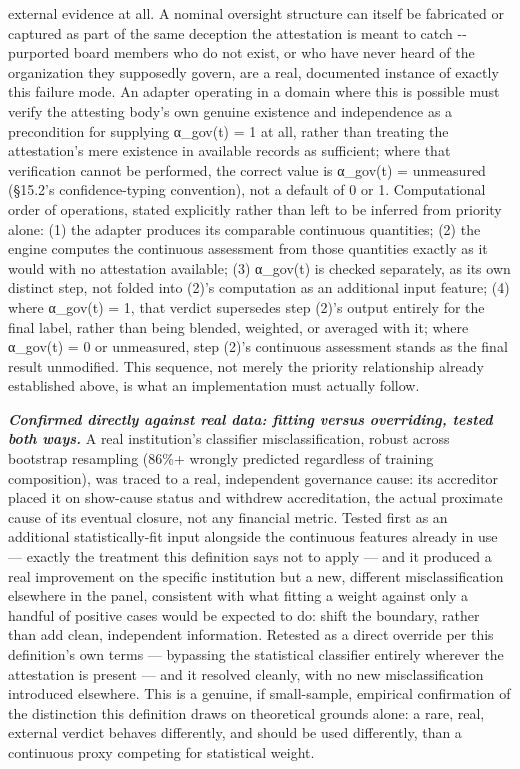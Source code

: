 \documentclass[
]{article}
\begin{document}
external evidence at all. A nominal oversight structure can itself be
fabricated or captured as part of the same deception the attestation is
meant to catch -\/- purported board members who do not exist, or who
have never heard of the organization they supposedly govern, are a real,
documented instance of exactly this failure mode. An adapter operating
in a domain where this is possible must verify the attesting body's own
genuine existence and independence as a precondition for supplying
α\_gov(t) = 1 at all, rather than treating the attestation's mere
existence in available records as sufficient; where that verification
cannot be performed, the correct value is α\_gov(t) = unmeasured
(§15.2's confidence-typing convention), not a default of 0 or 1.
Computational order of operations, stated explicitly rather than left to
be inferred from priority alone: (1) the adapter produces its comparable
continuous quantities; (2) the engine computes the continuous assessment
from those quantities exactly as it would with no attestation available;
(3) α\_gov(t) is checked separately, as its own distinct step, not
folded into (2)'s computation as an additional input feature; (4) where
α\_gov(t) = 1, that verdict supersedes step (2)'s output entirely for
the final label, rather than being blended, weighted, or averaged with
it; where α\_gov(t) = 0 or unmeasured, step (2)'s continuous assessment
stands as the final result unmodified. This sequence, not merely the
priority relationship already established above, is what an
implementation must actually follow.

\emph{\textbf{Confirmed directly against real data: fitting versus
overriding, tested both ways.}} A real institution's classifier
misclassification, robust across bootstrap resampling (86\%+ wrongly
predicted regardless of training composition), was traced to a real,
independent governance cause: its accreditor placed it on show-cause
status and withdrew accreditation, the actual proximate cause of its
eventual closure, not any financial metric. Tested first as an
additional statistically-fit input alongside the continuous features
already in use --- exactly the treatment this definition says not to
apply --- and it produced a real improvement on the specific institution
but a new, different misclassification elsewhere in the panel,
consistent with what fitting a weight against only a handful of positive
cases would be expected to do: shift the boundary, rather than add
clean, independent information. Retested as a direct override per this
definition's own terms --- bypassing the statistical classifier entirely
wherever the attestation is present --- and it resolved cleanly, with no
new misclassification introduced elsewhere. This is a genuine, if
small-sample, empirical confirmation of the distinction this definition
draws on theoretical grounds alone: a rare, real, external verdict
behaves differently, and should be used differently, than a continuous
proxy competing for statistical weight.
\end{document}
